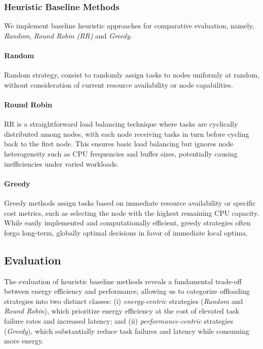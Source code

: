 \documentclass[preprint,3p,authoryear]{elsarticle}
\begin{document}
\subsubsection{Heuristic Baseline Methods}\label{subsubsec:heuristic_baselines}
We implement baseline heuristic approaches for comparative evaluation, namely, \emph{Random}, \emph{Round Robin (RR)} and \emph{Greedy}.

\paragraph{Random}
Random strategy, consist to randomly assign tasks to nodes uniformly at random, without consideration of current resource availability or node capabilities.

\paragraph{Round Robin}
RR is a straightforward load balancing technique where tasks are cyclically distributed among nodes, with each node receiving tasks in turn before cycling back to the first node. This ensures basic load balancing but ignores node heterogeneity such as CPU frequencies and buffer sizes, potentially causing inefficiencies under varied workloads. 

\paragraph{Greedy}
Greedy methods assign tasks based on immediate resource availability or specific cost metrics, such as selecting the node with the highest remaining CPU capacity. While easily implemented and computationally efficient, greedy strategies often forgo long-term, globally optimal decisions in favor of immediate local optima.




\subsection{Evaluation}

The evaluation of heuristic baseline methods reveals a fundamental trade-off between energy efficiency and performance, allowing us to categorize offloading strategies into two distinct classes: (i) \emph{energy-centric} strategies (\emph{Random} and \emph{Round Robin}), which prioritize energy efficiency at the cost of elevated task failure rates and increased latency; and (ii) \emph{performance-centric} strategies (\emph{Greedy}), which substantially reduce task failures and latency while consuming more energy.
\end{document}
